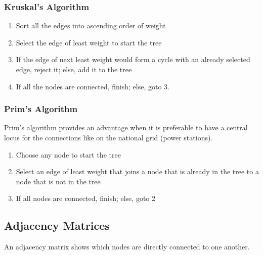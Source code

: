 \documentclass{article}
\begin{document}
\subsubsection{Kruskal's Algorithm}

\begin{enumerate}
	\item Sort all the edges into ascending order of weight
	\item Select the edge of least weight to start the tree
	\item If the edge of next least weight would form a cycle with an already selected edge, reject it; else, add it to the tree
	\item If all the nodes are connected, finish; else, goto 3.
\end{enumerate}

\subsubsection{Prim's Algorithm}

Prim's algorithm provides an advantage when it is preferable to have a central locus for the connections like on the national grid (power stations).
\begin{enumerate}
	\item Choose any node to start the tree
	\item Select an edge of least weight that joins a node that is already in the tree to a node that is not in the tree
	\item If all nodes are connected, finish; else, goto 2
\end{enumerate}

\subsection{Adjacency Matrices}

An adjacency matrix shows which nodes are directly connected to one another. 
\end{document}
